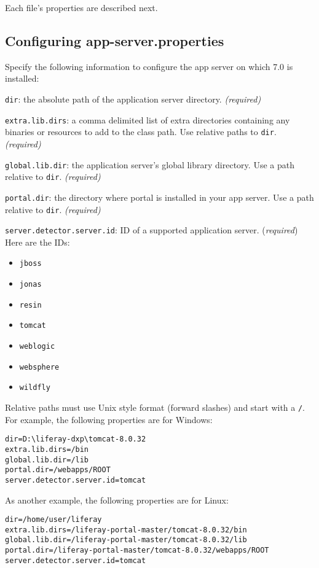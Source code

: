 Each file's properties are described next.

\subsection{Configuring
app-server.properties}\label{configuring-app-server.properties}

Specify the following information to configure the app server on which
7.0 is installed:

\texttt{dir}: the absolute path of the application server directory.
\emph{(required)}

\texttt{extra.lib.dirs}: a comma delimited list of extra directories
containing any binaries or resources to add to the class path. Use
relative paths to \texttt{dir}. \emph{(required)}

\texttt{global.lib.dir}: the application server's global library
directory. Use a path relative to \texttt{dir}. \emph{(required)}

\texttt{portal.dir}: the directory where portal is installed in your app
server. Use a path relative to \texttt{dir}. \emph{(required)}

\texttt{server.detector.server.id}: ID of a supported application
server. (\emph{required}) Here are the IDs:

\begin{itemize}
\tightlist
\item
  \texttt{jboss}
\item
  \texttt{jonas}
\item
  \texttt{resin}
\item
  \texttt{tomcat}
\item
  \texttt{weblogic}
\item
  \texttt{websphere}
\item
  \texttt{wildfly}
\end{itemize}

Relative paths must use Unix style format (forward slashes) and start
with a \texttt{/}. For example, the following properties are for
Windows:

\begin{verbatim}
dir=D:\liferay-dxp\tomcat-8.0.32
extra.lib.dirs=/bin
global.lib.dir=/lib
portal.dir=/webapps/ROOT
server.detector.server.id=tomcat
\end{verbatim}

As another example, the following properties are for Linux:

\begin{verbatim}
dir=/home/user/liferay
extra.lib.dirs=/liferay-portal-master/tomcat-8.0.32/bin
global.lib.dir=/liferay-portal-master/tomcat-8.0.32/lib
portal.dir=/liferay-portal-master/tomcat-8.0.32/webapps/ROOT
server.detector.server.id=tomcat
\end{verbatim}

